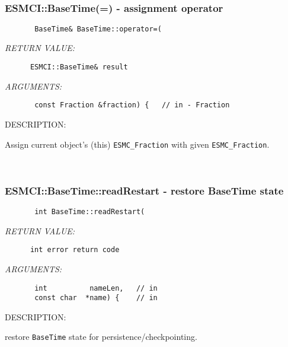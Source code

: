  
\mbox{}\hrulefill\ 
 
\subsubsection [ESMCI::BaseTime(=)] {ESMCI::BaseTime(=) - assignment operator}


  
\begin{verbatim}       BaseTime& BaseTime::operator=(\end{verbatim}{\em RETURN VALUE:}
\begin{verbatim}      ESMCI::BaseTime& result\end{verbatim}{\em ARGUMENTS:}
\begin{verbatim}       const Fraction &fraction) {   // in - Fraction\end{verbatim}
{\sf DESCRIPTION:\\ }


        Assign current object's (this) {\tt ESMC\_Fraction} with given
        {\tt ESMC\_Fraction}.   
 
\mbox{}\hrulefill\ 
 
\subsubsection [ESMCI::BaseTime::readRestart] {ESMCI::BaseTime::readRestart - restore BaseTime state}


  
\begin{verbatim}       int BaseTime::readRestart(\end{verbatim}{\em RETURN VALUE:}
\begin{verbatim}      int error return code\end{verbatim}{\em ARGUMENTS:}
\begin{verbatim}       int          nameLen,   // in
       const char  *name) {    // in\end{verbatim}
{\sf DESCRIPTION:\\ }


        restore {\tt BaseTime} state for persistence/checkpointing.
   
 
\mbox{}\hrulefill\ 
 
